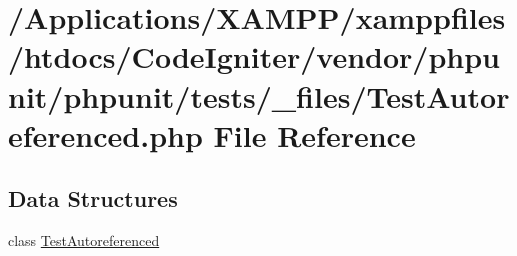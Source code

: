 \hypertarget{_test_autoreferenced_8php}{}\section{/\+Applications/\+X\+A\+M\+P\+P/xamppfiles/htdocs/\+Code\+Igniter/vendor/phpunit/phpunit/tests/\+\_\+files/\+Test\+Autoreferenced.php File Reference}
\label{_test_autoreferenced_8php}
\subsection*{Data Structures}
\begin{DoxyCompactItemize}
\item 
class \mbox{\hyperlink{class_test_autoreferenced}{Test\+Autoreferenced}}
\end{DoxyCompactItemize}
